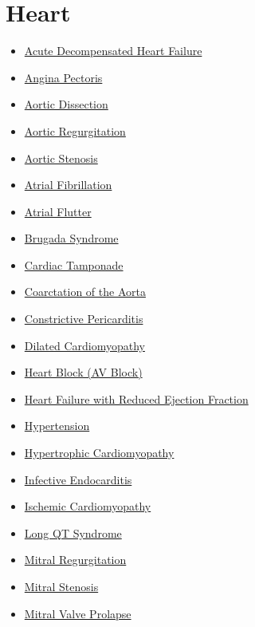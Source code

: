 \section*{Heart}
\label{sec:organ_heart}
\begin{itemize}[noitemsep]
  \item \hyperlink{sec:Acute Decompensated Heart Failure}{Acute Decompensated Heart Failure}
  \item \hyperlink{sec:Angina Pectoris}{Angina Pectoris}
  \item \hyperlink{sec:Aortic Dissection}{Aortic Dissection}
  \item \hyperlink{sec:Aortic Regurgitation}{Aortic Regurgitation}
  \item \hyperlink{sec:Aortic Stenosis}{Aortic Stenosis}
  \item \hyperlink{sec:Atrial Fibrillation}{Atrial Fibrillation}
  \item \hyperlink{sec:Atrial Flutter}{Atrial Flutter}
  \item \hyperlink{sec:Brugada Syndrome}{Brugada Syndrome}
  \item \hyperlink{sec:Cardiac Tamponade}{Cardiac Tamponade}
  \item \hyperlink{sec:Coarctation of the Aorta}{Coarctation of the Aorta}
  \item \hyperlink{sec:Constrictive Pericarditis}{Constrictive Pericarditis}
  \item \hyperlink{sec:Dilated Cardiomyopathy}{Dilated Cardiomyopathy}
  \item \hyperlink{sec:Heart Block (AV Block)}{Heart Block (AV Block)}
  \item \hyperlink{sec:Heart Failure with Reduced Ejection Fraction}{Heart Failure with Reduced Ejection Fraction}
  \item \hyperlink{sec:Hypertension}{Hypertension}
  \item \hyperlink{sec:Hypertrophic Cardiomyopathy}{Hypertrophic Cardiomyopathy}
  \item \hyperlink{sec:Infective Endocarditis}{Infective Endocarditis}
  \item \hyperlink{sec:Ischemic Cardiomyopathy}{Ischemic Cardiomyopathy}
  \item \hyperlink{sec:Long QT Syndrome}{Long QT Syndrome}
  \item \hyperlink{sec:Mitral Regurgitation}{Mitral Regurgitation}
  \item \hyperlink{sec:Mitral Stenosis}{Mitral Stenosis}
  \item \hyperlink{sec:Mitral Valve Prolapse}{Mitral Valve Prolapse}

\end{itemize}
